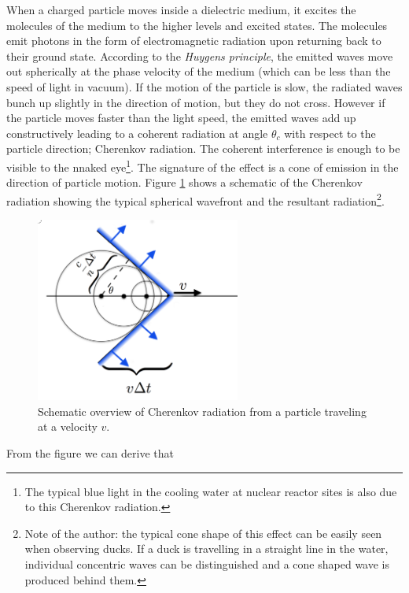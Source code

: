 When a charged particle moves inside a dielectric medium, it excites the molecules of the medium to the higher levels and excited states. The molecules emit photons in the form of electromagnetic radiation upon returning back to their ground state. According to the \textit{Huygens principle}, the emitted waves move out spherically at the phase velocity of the medium (which can be less than the speed of light in vacuum). If the motion of the particle is slow, the radiated waves bunch up slightly in the direction of motion, but they do not cross. However if the particle moves faster than the light speed, the emitted waves add up constructively leading to a coherent radiation at angle $\theta_c$ with respect to the particle direction; Cherenkov radiation. The coherent interference is enough to be visible to the nnaked eye\footnote{The typical blue light in the cooling water at nuclear reactor sites is also due to this Cherenkov radiation.}. The signature of the effect is a cone of emission in the direction of particle motion. Figure \ref{fig:cherenkov} shows a schematic of the Cherenkov radiation showing the typical spherical wavefront and the resultant radiation\footnote{Note of the author: the typical cone shape of this effect can be easily seen when observing ducks. If a duck is travelling in a straight line in the water, individual concentric waves can be distinguished and a cone shaped wave is produced behind them.}.

\begin{figure}[ht]
\centering
\includegraphics[width=0.6\textwidth]{chapter4/img/cherenkov2.png}
\caption{Schematic overview of Cherenkov radiation from a particle traveling at a velocity $v$.}
\label{fig:cherenkov}
\end{figure}

From the figure we can derive that

